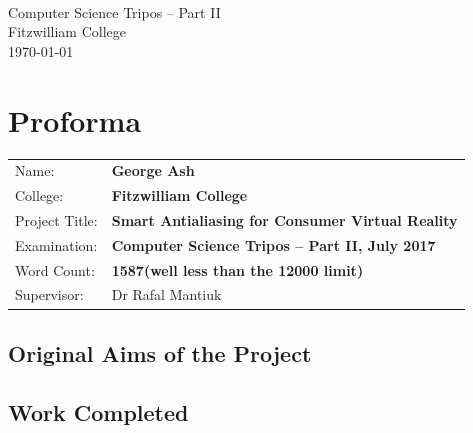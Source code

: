 \documentclass[12pt,a4paper,twoside,openright]{report}
\begin{document}





\pagestyle{empty}


\vspace*{60mm}
\begin{center}
\Huge
\textbf{} \\[5mm]
Computer Science Tripos -- Part II \\[5mm]
Fitzwilliam College \\[5mm]
\today  %
\end{center}


\pagestyle{plain}

\chapter*{Proforma}

{\large
\begin{tabular}{ll}
Name:               & \bf George Ash                       \\
College:            & \bf Fitzwilliam College                     \\
Project Title:      & \bf Smart Antialiasing for Consumer Virtual Reality \\
Examination:        & \bf Computer Science Tripos -- Part II, July 2017  \\
Word Count:         & \bf 1587\footnotemark[1]
                      (well less than the 12000 limit)  \\
Supervisor:         & Dr Rafal Mantiuk                    \\ 
\end{tabular}
}


\section*{Original Aims of the Project}



\section*{Work Completed}
\end{document}
